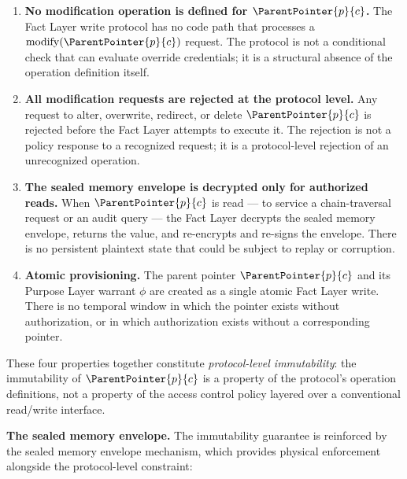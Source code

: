 \begin{enumerate}
    \item[(W1)] \textbf{No modification operation is defined for $\ParentPointer{p}{c}$.} The Fact Layer write protocol has no code path that processes a $\mathrm{modify}(\ParentPointer{p}{c})$ request. The protocol is not a conditional check that can evaluate override credentials; it is a structural absence of the operation definition itself.

    \item[(W2)] \textbf{All modification requests are rejected at the protocol level.} Any request to alter, overwrite, redirect, or delete $\ParentPointer{p}{c}$ is rejected before the Fact Layer attempts to execute it. The rejection is not a policy response to a recognized request; it is a protocol-level rejection of an unrecognized operation.

    \item[(W3)] \textbf{The sealed memory envelope is decrypted only for authorized reads.} When $\ParentPointer{p}{c}$ is read --- to service a chain-traversal request or an audit query --- the Fact Layer decrypts the sealed memory envelope, returns the value, and re-encrypts and re-signs the envelope. There is no persistent plaintext state that could be subject to replay or corruption.

    \item[(W4)] \textbf{Atomic provisioning.} The parent pointer $\ParentPointer{p}{c}$ and its Purpose Layer warrant $\phi$ are created as a single atomic Fact Layer write. There is no temporal window in which the pointer exists without authorization, or in which authorization exists without a corresponding pointer.
\end{enumerate}

These four properties together constitute \emph{protocol-level immutability}: the immutability of $\ParentPointer{p}{c}$ is a property of the protocol's operation definitions, not a property of the access control policy layered over a conventional read/write interface.

\medskip
\noindent\textbf{The sealed memory envelope.} The immutability guarantee is reinforced by the sealed memory envelope mechanism, which provides physical enforcement alongside the protocol-level constraint:

